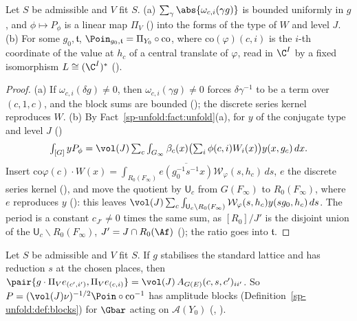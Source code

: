 \begin{theorem}\label{sp-unfold:thm:series}
Let $S$ be admissible and $V$ fit $S$. (a) $\sum_\gamma\abs{\omega_{c,i}(\gamma g)}$ is bounded
uniformly in $g$, and $\phi\mapsto P_\phi$ is a linear map $\Pi_V$ ()
into the forms of the type of $W$ and level $J$. (b) For some $g_0,\mathfrak t$, $\Poin_{g_0,\mathfrak t}=\Pi_{Y_0}\circ
\mathrm{co}$, where $\mathrm{co}(\varphi)(c,i)$ is the $i$-th coordinate of the value at $h_c$ of
a central translate of $\varphi$, read in $\C^I$ by a fixed isomorphism $L\cong(\C^I)^*$
().
\end{theorem}

\begin{proof}
(a) If $\omega_{c,i}(\delta g)\ne0$, then $\omega_{c,i}(\gamma g)\ne0$ forces $\delta\gamma^{-1}$ to be a
term over $(c,1,c)$, and the block sums are bounded
(); the discrete series kernel
reproduces $W$. (b) By Fact~\ref{sp-unfold:fact:unfold}(a), for $y$ of the conjugate type and level
$J$ ()
\[
\textstyle\int_{[G]}yP_\phi=\vol(J)\sum_c\int_{G_\infty}\beta_c(x)\bigl(\sum_i\phi(c,i)W_i(x)\bigr)
y(x,g_c)\,dx.
\]
Insert $\mathrm{co}\varphi(c)\cdot W(x)=\int_{R_0(F_\infty)}\overline{e(g_0^{-1}s^{-1}x)}
\mathcal W_\varphi(s,h_c)\,ds$, $e$ the discrete series kernel
(), and move the quotient by $\mathsf
U_c$ from $G(F_\infty)$ to $R_0(F_\infty)$, where $e$ reproduces $y$
(): this leaves
$\vol(J)\sum_c\int_{\mathsf U_c\backslash R_0(F_\infty)}\mathcal W_\varphi(s,h_c)y(sg_0,h_c)\,ds$. The
period is a constant $c_{J'}\ne0$ times the same sum, as $[R_0]/J'$ is the disjoint union of the $\mathsf
U_c\backslash R_0(F_\infty)$, $J'=J\cap R_0(\Af)$
(); the ratio goes into $\mathfrak t$.
\end{proof}

\begin{theorem}
\label{sp-unfold:thm:petersson}
Let $S$ be admissible and $V$ fit $S$. If $g$ stabilises the standard lattice and has reduction $s$
at the chosen places, then $\pair{g\cdot\Pi_Ve_{(c',i')},\Pi_Ve_{(c,i)}}=\vol(J)\,
A_{G(E)}(c,s,c')_{ii'}$. So $P=(\vol(J)\nu)^{-1/2}\Poin\circ\mathrm{co}^{-1}$ has amplitude blocks
(Definition~\ref{sp-unfold:def:blocks}) for $\Gbar$ acting on $\mathcal A(Y_0)$
(, ).
\end{theorem}

